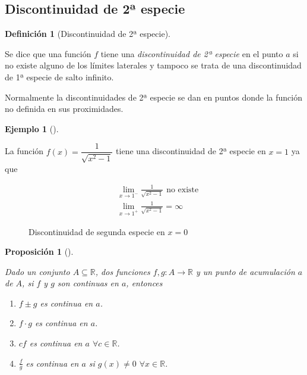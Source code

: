 \documentclass[
  a4paper,
]{scrreport}
\providecommand{\tightlist}{%
  \setlength{\itemsep}{0pt}\setlength{\parskip}{0pt}}\usepackage{longtable,booktabs,array}
\theoremstyle{definition}
\newtheorem{example}{Ejemplo}[chapter]
\theoremstyle{plain}
\theoremstyle{definition}
\newtheorem{definition}{Definición}[chapter]
\theoremstyle{definition}
\theoremstyle{plain}
\theoremstyle{plain}
\newtheorem{proposition}{Proposición}[chapter]
\theoremstyle{remark}
\begin{document}
\subsection{Discontinuidad de 2ª
especie}\label{discontinuidad-de-2uxaa-especie}

\begin{definition}[Discontinuidad de 2ª
especie]\protect\hypertarget{def-discontinuidad-2-especie}{}\label{def-discontinuidad-2-especie}

Se dice que una función \(f\) tiene una \emph{discontinuidad de 2ª
especie} en el punto \(a\) si no existe alguno de los límites laterales
y tampoco se trata de una discontinuidad de 1ª especie de salto
infinito.

\end{definition}

Normalmente la discontinuidades de 2ª especie se dan en puntos donde la
función no definida en sus proximidades.

\begin{example}[]\protect\hypertarget{exm-discontinuidad-2-especie}{}\label{exm-discontinuidad-2-especie}

La función \(f(x)=\dfrac{1}{\sqrt{x^2-1}}\) tiene una discontinuidad de
2ª especie en \(x=1\) ya que

\begin{align*}
& \lim_{x\to 1^-}\frac{1}{\sqrt{x^2-1}} \mbox{ no existe}  \\
& \lim_{x\to 1^+}\frac{1}{\sqrt{x^2-1}}=\infty
\end{align*}

\begin{figure}
\centering

\caption{Discontinuidad de segunda especie en \(x=0\)}
\end{figure}

\end{example}

\begin{proposition}[]\protect\hypertarget{prp-algebra-funciones-continuas}{}\label{prp-algebra-funciones-continuas}

Dado un conjunto \(A\subseteq \mathbb{R}\), dos funciones
\(f,g:A\to \mathbb{R}\) y un punto de acumulación \(a\) de \(A\), si
\(f\) y \(g\) son continuas en \(a\), entonces

\begin{enumerate}
\def\labelenumi{\alph{enumi}.}
\tightlist
\item
  \(f\pm g\) es continua en \(a\).
\item
  \(f\cdot g\) es continua en \(a\).
\item
  \(cf\) es continua en \(a\) \(\forall c\in\mathbb{R}\).
\item
  \(\frac{f}{g}\) es continua en \(a\) si \(g(x)\neq 0\)
  \(\forall x\in\mathbb{R}\).
\end{enumerate}

\end{proposition}
\end{document}

